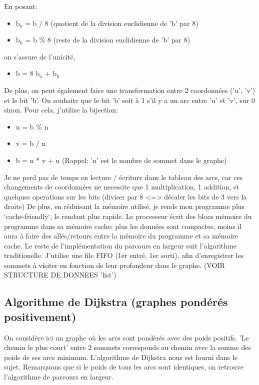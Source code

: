 \documentclass[a4paper,10pt]{article}
\begin{document}
    En posant:
    \begin{itemize}[label=-]
      \item $\textrm{b}_\textrm{o}$ = b / 8 (quotient de la division euclidienne de 'b' par 8)
      \item $\textrm{b}_\textrm{b}$ = b \% 8 (reste de la division euclidienne de 'b' par 8)
    \end{itemize}
    on s'assure de l'unicité,
    \begin{itemize}[label=-]
      \item b = 8 $\textrm{b}_\textrm{o}$ + $\textrm{b}_\textrm{b}$
    \end{itemize}
    De plus, on peut également faire une transformation entre 2 coordonnées ('u', 'v') et le bit 'b'.
    On souhaite que le bit 'b' soit à 1 s'il y a un arc entre 'u' et 'v', sur 0 sinon.
    Pour cela, j'utilise la bijection:
    \begin{itemize}[label=-]
      \item u = b \% n
      \item v = b / n
      \item b = n * v + u (Rappel: 'n' est le nombre de sommet dans le graphe)
    \end{itemize}
    Je ne perd pas de temps en lecture / écriture dans le tableau des arcs, car ces changements
    de coordonnées ne necessite que 1 multiplication, 1 addition, et quelques operations sur les bits (diviser par 8 <=> décaler
    les bits de 3 vers la droite)\newline\newline
    De plus, en réduisant la mémoire utilisé, je rends mon programme plus `cache-friendly`, le rendant plus rapide.
    Le processeur écrit des blocs mémoire du programme dans sa mémoire cache: plus les données sont compactes,
    moins il aura à faire des allés/retours entre la mémoire du programme et sa mémoire cache.\newline\newline
    Le reste de l'implémentation du parcours en largeur suit l'algorithme traditionelle.
    J'utilise une file FIFO (1er entré, 1er sorti), afin d'enregistrer les sommets à visiter en fonction de leur profondeur dans le graphe.\newline
    (VOIR STRUCTURE DE DONNEES 'list') 
    
  \newpage
  \subsection{Algorithme de Dijkstra (graphes pondérés positivement)}
    On considère ici un graphe où les arcs sont pondérés avec des poids positifs.\newline
    'Le chemin le plus court' entre 2 sommets corresponds au chemin avec la somme des poids de ses arcs minimum.\newline
     L'algorithme de Dijkstra nous est fourni dans le sujet. Remarquons que si le poids de tous les arcs sont identiques,
     on retrouve l'algorithme de parcours en largeur.\newline
\end{document}
